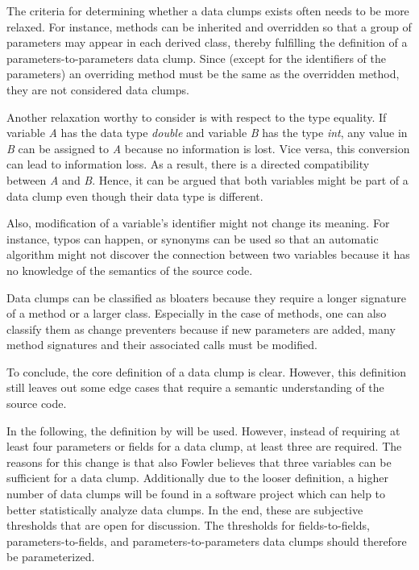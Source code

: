 The criteria for determining whether a data clumps exists often needs to be more relaxed. For instance, methods can be inherited and overridden so that a group of parameters may appear in each derived class, thereby fulfilling the definition of a  parameters-to-parameters data clump. Since (except for the identifiers of the parameters) an overriding method must be the same as the overridden method, they are not considered data clumps.


Another relaxation worthy to consider is with respect to the type equality. If variable \textit{A} has the data type \textit{double} and variable \textit{B} has the type \textit{int}, any value in \textit{B} can be assigned to \textit{A} because no information is lost. Vice versa, this conversion can lead to information loss. As a result, there is a directed compatibility between \textit{A} and \textit{B}. Hence, it can be argued that both variables might be part of a data clump even though their data type is different. 


Also, modification of a variable's identifier might not change its meaning. For instance, typos can happen, or synonyms can be used so that an automatic algorithm might not discover the connection between two variables because it has no knowledge of the semantics of the source code. \cite{zhangImprovingPrecisionFowler2008}


Data clumps can be classified as bloaters because they require a longer signature of a method or a larger class. Especially in the case of methods, one can also classify them as change preventers because if new parameters are added, many method signatures and their associated calls must be modified.

To conclude, the core definition of a data clump is clear. However, this definition still leaves out some edge cases that require a semantic understanding of the source code. 



In the following, the definition by \cite{zhangImprovingPrecisionFowler2008} will be used. However,  instead of requiring at least four parameters or fields for a data clump, at least three are required. The reasons for this change is that also Fowler believes that three variables can be sufficient for a data clump. Additionally due to the looser definition, a higher number of data clumps will be found in a software project which can help to better statistically analyze data clumps. In the end, these are subjective thresholds that are open for discussion. The thresholds for fields-to-fields, parameters-to-fields, and parameters-to-parameters data clumps should therefore be parameterized.



